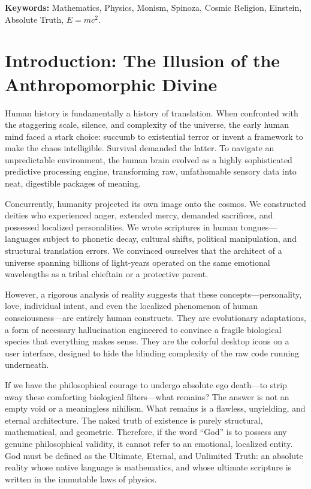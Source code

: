 \documentclass[12pt]{article}
\begin{document}
\textbf{Keywords:} Mathematics, Physics, Monism, Spinoza, Cosmic Religion, Einstein, Absolute Truth, $E=mc^2$.

\newpage

\section{Introduction: The Illusion of the Anthropomorphic Divine}
Human history is fundamentally a history of translation. When confronted with the staggering scale, silence, and complexity of the universe, the early human mind faced a stark choice: succumb to existential terror or invent a framework to make the chaos intelligible. Survival demanded the latter. To navigate an unpredictable environment, the human brain evolved as a highly sophisticated predictive processing engine, transforming raw, unfathomable sensory data into neat, digestible packages of meaning.

Concurrently, humanity projected its own image onto the cosmos. We constructed deities who experienced anger, extended mercy, demanded sacrifices, and possessed localized personalities. We wrote scriptures in human tongues—languages subject to phonetic decay, cultural shifts, political manipulation, and structural translation errors. We convinced ourselves that the architect of a universe spanning billions of light-years operated on the same emotional wavelengths as a tribal chieftain or a protective parent.

However, a rigorous analysis of reality suggests that these concepts—personality, love, individual intent, and even the localized phenomenon of human consciousness—are entirely human constructs. They are evolutionary adaptations, a form of necessary hallucination engineered to convince a fragile biological species that everything makes sense. They are the colorful desktop icons on a user interface, designed to hide the blinding complexity of the raw code running underneath.

If we have the philosophical courage to undergo absolute ego death—to strip away these comforting biological filters—what remains? The answer is not an empty void or a meaningless nihilism. What remains is a flawless, unyielding, and eternal architecture. The naked truth of existence is purely structural, mathematical, and geometric. Therefore, if the word ``God'' is to possess any genuine philosophical validity, it cannot refer to an emotional, localized entity. God must be defined as the Ultimate, Eternal, and Unlimited Truth: an absolute reality whose native language is mathematics, and whose ultimate scripture is written in the immutable laws of physics.
\end{document}
